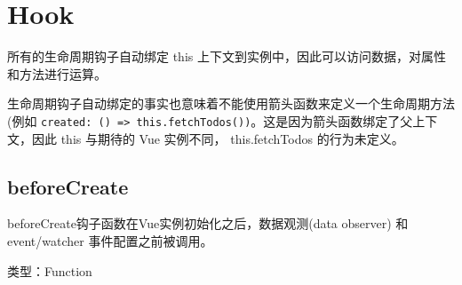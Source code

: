 \begin{lstlisting}[language=JavaScript]

\end{lstlisting}




\begin{lstlisting}[language=JavaScript]

\end{lstlisting}




\begin{lstlisting}[language=JavaScript]

\end{lstlisting}




\begin{lstlisting}[language=JavaScript]

\end{lstlisting}




\begin{lstlisting}[language=JavaScript]

\end{lstlisting}







\chapter{Hook}


所有的生命周期钩子自动绑定 this 上下文到实例中，因此可以访问数据，对属性和方法进行运算。

生命周期钩子自动绑定的事实也意味着不能使用箭头函数来定义一个生命周期方法 (例如 \texttt{created: () => this.fetchTodos())}。这是因为箭头函数绑定了父上下文，因此 this 与期待的 Vue 实例不同， this.fetchTodos 的行为未定义。

\section{beforeCreate}

beforeCreate钩子函数在Vue实例初始化之后，数据观测(data observer) 和 event/watcher 事件配置之前被调用。

\begin{compactitem}
\item 类型：Function
\end{compactitem}

\begin{lstlisting}[language=JavaScript]

\end{lstlisting}




